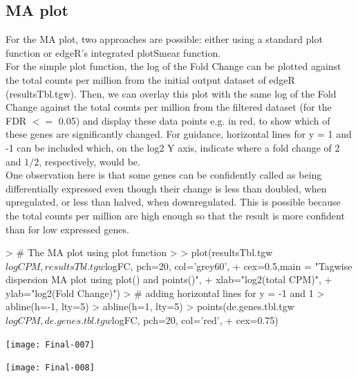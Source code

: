 \documentclass[a4paper,11pt]{article}
\begin{document}
\subsection{MA plot}
For the MA plot, two approaches are possible: either using a standard plot function or edgeR's integrated plotSmear function.\\

For the simple plot function, the log of the Fold Change can be plotted against the total counts per million from the initial output dataset of edgeR (resultsTbl.tgw). Then, we can overlay this plot with the same log of the Fold Change against the total counts per million from the filtered dataset (for the FDR $<=$ 0.05) and display these data points e.g. in red, to show which of these genes are significantly changed. For guidance, horizontal lines for y = 1 and -1 can be included which, on the log2 Y axis, indicate where a fold change of 2 and $1/2$, respectively, would be.\\

One observation here is that some genes can be confidently called as being differentially expressed even though their change is less than doubled, when upregulated, or less than halved, when downregulated. This is possible because the total counts per million are high enough so that the result is more confident than for low expressed genes.


\begin{Schunk}
\begin{Sinput}
> # The MA plot using plot function
> 
> plot(resultsTbl.tgw$logCPM, resultsTbl.tgw$logFC, pch=20, col='grey60',
+      cex=0.5,main = "Tagwise dispersion MA plot using plot() and points()",
+      xlab="log2(total CPM)", 
+      ylab="log2(Fold Change)")
> # adding horizontal lines for y = -1 and 1
> abline(h=-1, lty=5)
> abline(h=1, lty=5)
> points(de.genes.tbl.tgw$logCPM, de.genes.tbl.tgw$logFC, pch=20, col='red',
+        cex=0.75)
\end{Sinput}
\end{Schunk}
\texttt{[image: Final-007]}

\begin{Schunk}
\end{Schunk}
\texttt{[image: Final-008]}
\end{document}
